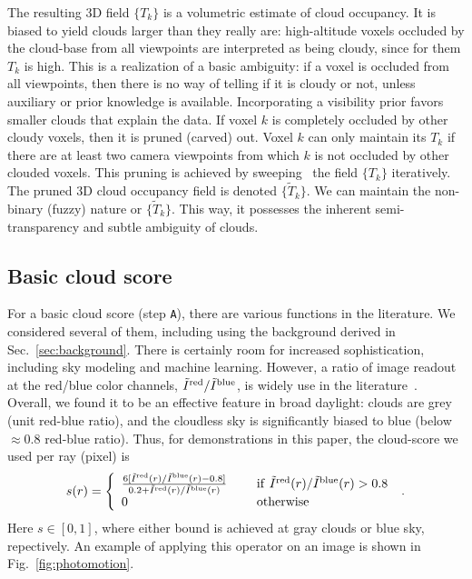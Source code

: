 \documentclass[runningheads]{llncs}
\begin{document}
The resulting 3D field $\{T_k\}$ is a volumetric estimate of cloud occupancy. It is biased to yield clouds larger than they really are: high-altitude voxels occluded by the cloud-base from all viewpoints are interpreted as being cloudy, since for them $T_k$ is high. This is a realization of a basic ambiguity: if a voxel is occluded from all viewpoints, then there is no way of telling if it is cloudy or not, unless auxiliary or prior knowledge is available. Incorporating a visibility prior favors smaller clouds that explain the data. If voxel $k$ is completely occluded by other cloudy voxels, then it is pruned (carved) out. Voxel $k$ can only maintain its $T_k$ if there are at least two camera viewpoints from which $k$ is not occluded by other clouded voxels. This pruning is achieved by sweeping~\cite{Kutulakos2000} the field $\{T_k\}$ iteratively. The pruned 3D cloud occupancy field is denoted $\{\tilde T_k\}$. We can maintain the non-binary (fuzzy) nature or $\{\tilde T_k\}$. This way, it possesses the inherent semi-transparency and subtle ambiguity of clouds.

\subsection*{Basic cloud score}
\label{sec:cloudscore}


For a basic cloud score (step {\tt A}), there are various functions in the literature. We considered several of them, including using the background derived in Sec.~\ref{sec:background}. There is certainly room for increased sophistication, including sky modeling and machine learning. However,
a ratio of image readout at the red/blue color channels, $\tilde I^{\rm red}/\tilde I^{\rm blue}$, is widely use in the literature~\cite{Yamashita2004,Seiz2002}. Overall, we found it to be an effective feature in broad daylight: clouds are grey (unit red-blue ratio), and the cloudless sky is significantly biased to blue
(below $\approx 0.8$ red-blue ratio). Thus, for demonstrations in this paper,
the cloud-score we used per ray (pixel) is
\begin{equation}
 s(r)=\left\{
      \begin{array}{ll}
      \frac{6 [\tilde I^{\rm red}(r)/\tilde I^{\rm blue}(r)-0.8]}
           {0.2+\tilde I^{\rm red}(r)/\tilde I^{\rm blue}(r)}
      & ~~~~{\rm if}~ \tilde I^{\rm red}(r)/\tilde I^{\rm blue}(r)>0.8 \\
      0
      & ~~~~{\rm otherwise}
      \end{array}
      \right.
  \;.
 \label{eq:sr}
\end{equation}
Here $s\in[0,1]$, where either bound is achieved at gray clouds or blue sky, repectively. An example of applying this operator on an image is shown in Fig.~\ref{fig:photomotion}.
\end{document}
